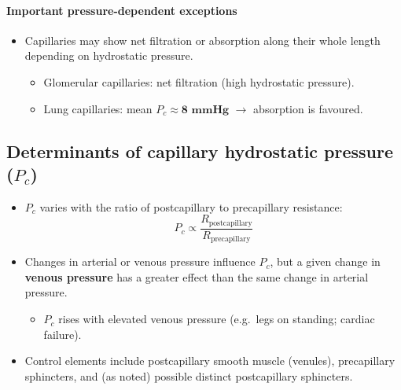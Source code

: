 \documentclass[11pt,a4paper]{article}
\begin{document}
\paragraph{Important pressure-dependent exceptions}
\begin{itemize}
\item Capillaries may show net filtration or absorption along their whole length depending on hydrostatic pressure.
  \begin{itemize}
  \item Glomerular capillaries: net filtration (high hydrostatic pressure).
  \item Lung capillaries: mean $P_c \approx \textbf{8 mmHg}$ $\rightarrow$ absorption is favoured.
  \end{itemize}
\end{itemize}

\subsection{Determinants of capillary hydrostatic pressure ($P_c$)}
\begin{itemize}
\item $P_c$ varies with the ratio of postcapillary to precapillary resistance:
  \[
  P_c \propto \frac{R_{\text{postcapillary}}}{R_{\text{precapillary}}}
  \]
\item Changes in arterial or venous pressure influence $P_c$, but a given change in \textbf{venous pressure} has a greater effect than the same change in arterial pressure.
  \begin{itemize}
  \item $P_c$ rises with elevated venous pressure (e.g.\ legs on standing; cardiac failure).
  \end{itemize}
\item Control elements include postcapillary smooth muscle (venules), precapillary sphincters, and (as noted) possible distinct postcapillary sphincters.
\end{itemize}
\end{document}

